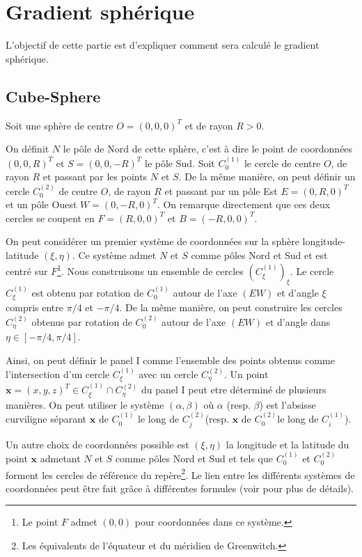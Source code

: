 \section{Gradient sphérique}

L'objectif de cette partie est d'expliquer comment sera calculé le gradient sphérique.

\subsection{Cube-Sphere}

Soit une sphère de centre $O = (0,0,0)^T$ et de rayon $R > 0$. 

On définit $N$ le p\^ole de Nord de cette sphère, c'est à dire le point de coordonnées $(0,0,R)^T$ et $S = (0,0,-R)^T$ le p\^ole Sud. Soit $C^{(1)}_0$ le cercle de centre $O$, de rayon $R$ et passant par les points $N$ et $S$. De la m\^eme manière, on peut définir un cercle $C^{(2)}_0$ de centre $O$, de rayon $R$ et passant par un p\^ole Est $E = (0,R,0)^T$ et un p\^ole Ouest $W = (0,-R,0)^T$. On remarque directement que ces deux cercles se coupent en $F = (R,0,0)^T$ et $B=(-R,0,0)^T$.

On peut considérer un premier système de coordonnées sur la sphère longitude-latitude $(\xi, \eta)$. Ce système admet $N$ et $S$ comme p\^oles Nord et Sud et est centré sur $F$\footnote{Le point $F$ admet $(0,0)$ pour coordonnées dans ce système.}.
Nous construisons un ensemble de cercles $\left( C^{(1)}_{\xi} \right)_{\xi}$. Le cercle $C^{(1)}_{\xi}$ est obtenu par rotation de $C^{(1)}_0$ autour de l'axe $(EW)$ et d'angle $\xi$ compris entre $\pi/4$ et $-\pi/4$. De la m\^eme manière, on peut construire les cercles $C^{(2)}_{\eta}$ obtenus par rotation de $C^{(2)}_0$ autour de l'axe $(EW)$ et d'angle dans $ \eta \in \left[ -\pi/4, \pi/4 \right]$.

Ainsi, on peut définir le panel I comme l'ensemble des points obtenus comme l'intersection d'un cercle $C^{(1)}_{\xi}$ avec un cercle $C^{(2)}_{\eta}$. Un point $\mathbf{x}=(x,y,z)^T \in C^{(1)}_{\xi} \cap C^{(2)}_{\eta}$ du panel I peut etre déterminé de plusieurs manières. On peut utiliser le système $(\alpha, \beta)$ où $\alpha$ (resp. $\beta$) est l'absisse curviligne séparant $\mathbf{x}$ de $C^{(1)}_0$ le long de $C^{(2)}_j$(resp. $\mathbf{x}$ de $C^{(2)}_0$le long de $C^{(1)}_i$).

Un autre choix de coordonnées possible est $(\xi, \eta)$ la longitude et la latitude du point $\mathbf{x}$ admetant $N$ et $S$ comme p\^oles Nord et Sud et tels que $C^{(1)}_0$ et $C^{(2)}_0$ forment les cercles de référence du repère\footnote{Les équivalents de l'équateur et du méridien de Greenwitch.}. Le lien entre les différents systèmes de coordonnées peut être fait grâce à différentes formules (voir \cite{Croisille2013} pour plus de détails).

